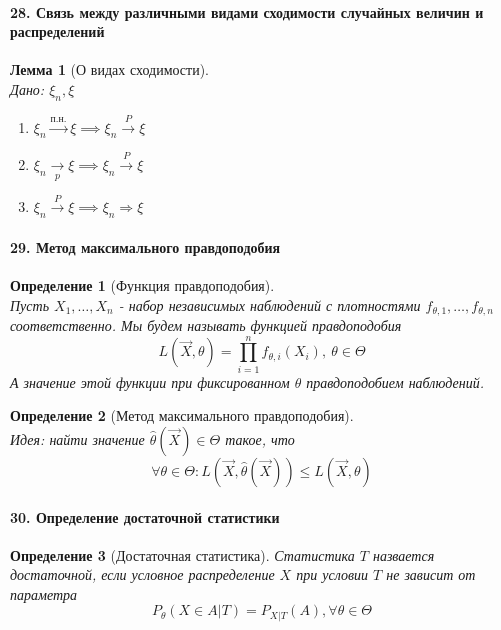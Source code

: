 \documentclass[titlepage]{article}
\newtheorem{lemma}{Лемма}
\newtheorem{definition}{Определение}
\begin{document}
\paragraph{28. Связь между различными видами сходимости случайных величин и распределений}
\begin{lemma}[О видах сходимости] ~\\
	Дано: $\xi_n,\xi$
	\begin{enumerate}
		\item $\xi_n\xrightarrow{\text{п.н.}}\xi \implies \xi_n \overset{P}{\rightarrow}\xi$
		\item $\xi_n\underset{p}{\rightarrow}\xi \implies \xi_n \overset{P}{\rightarrow}\xi$
		\item $\xi_n \overset{P}{\rightarrow}\xi \implies \xi_n \Rightarrow \xi$
	\end{enumerate}
\end{lemma}

\paragraph{29. Метод максимального правдоподобия}
\begin{definition}[Функция правдоподобия] ~\\
	Пусть $X_1,\dots,X_n$ - набор независимых наблюдений с плотностями $f_{\theta,1},\dots,f_{\theta,n}$ соответственно. Мы будем называть функцией правдоподобия
	\[L(\vec X, \theta) = \prod_{i=1}^nf_{\theta,i}(X_i),\ \theta \in \Theta\]
	А значение этой функции при фиксированном $\theta$ правдоподобием наблюдений.
\end{definition}
\begin{definition}[Метод максимального правдоподобия] ~\\
	Идея: найти значение $\hat\theta(\vec X) \in \Theta$ такое, что
	\[\forall \theta \in \Theta: L(\vec X, \hat\theta(\vec X)) \leq L(\vec X, \theta)\]
\end{definition}

\paragraph{30. Определение достаточной статистики}
\begin{definition}[Достаточная статистика]
	Статистика $T$ назвается достаточной, если условное распределение $X$ при условии $T$ не зависит от параметра
	$$P_\theta(X\in A|T) = P_{X|T}(A),\forall \theta \in \Theta $$
\end{definition}
\end{document}
